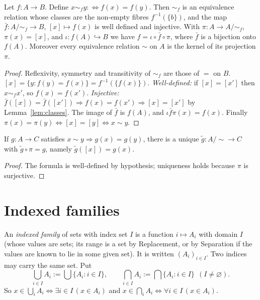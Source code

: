 \begin{theorem}[Factorisation]\label{thm:factor}
	Let $f:A\to B$. Define $x\sim_fy:\iff f(x)=f(y)$. Then $\sim_f$ is an equivalence relation whose classes are the non-empty fibres $f^{-1}(\{b\})$, and the map $\bar f:A/{\sim_f}\to B$, $[x]\mapsto f(x)$ is well defined and injective. With $\pi:A\to A/{\sim_f}$, $\pi(x)=[x]$, and $\iota:f(A)\hookrightarrow B$ we have $f=\iota\circ\bar f\circ\pi$, where $\bar f$ is a bijection onto $f(A)$. Moreover every equivalence relation $\sim$ on $A$ is the kernel of its projection $\pi$.
\end{theorem}
\begin{proof}
	Reflexivity, symmetry and transitivity of $\sim_f$ are those of $=$ on $B$. $[x]=\{y:f(y)=f(x)\}=f^{-1}(\{f(x)\})$. \emph{Well-defined:} if $[x]=[x']$ then $x\sim_fx'$, so $f(x)=f(x')$. \emph{Injective:} $\bar f([x])=\bar f([x'])\Rightarrow f(x)=f(x')\Rightarrow[x]=[x']$ by Lemma~\ref{lem:classes}. The image of $\bar f$ is $f(A)$, and $\iota\bar f\pi(x)=f(x)$. Finally $\pi(x)=\pi(y)\iff[x]=[y]\iff x\sim y$.
\end{proof}

\begin{corollary}
	If $g:A\to C$ satisfies $x\sim y\Rightarrow g(x)=g(y)$, there is a unique $\tilde g:A/{\sim}\to C$ with $\tilde g\circ\pi=g$, namely $\tilde g([x])=g(x)$.
\end{corollary}
\begin{proof}
	The formula is well-defined by hypothesis; uniqueness holds because $\pi$ is surjective.
\end{proof}

\section{Indexed families}

\begin{definition}
	An \emph{indexed family} of sets with index set $I$ is a function $i\mapsto A_i$ with domain $I$ (whose values are sets; its range is a set by Replacement, or by Separation if the values are known to lie in some given set). It is written $(A_i)_{i\in I}$. Two indices may carry the same set. Put
	\[
	\bigcup_{i\in I}A_i:=\bigcup\{A_i:i\in I\},\qquad\bigcap_{i\in I}A_i:=\bigcap\{A_i:i\in I\}\ \ (I\ne\varnothing).
	\]
	So $x\in\bigcup_iA_i\iff\exists i\in I\,(x\in A_i)$ and $x\in\bigcap_iA_i\iff\forall i\in I\,(x\in A_i)$.
\end{definition}

